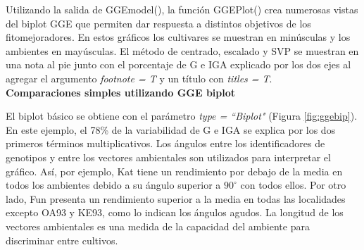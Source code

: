 Utilizando la salida de \textcolor{fandango}{GGEmodel()}, la función 
\textcolor{fandango}{GGEPlot()} crea numerosas vistas del biplot GGE que permiten dar respuesta a distintos objetivos de los fitomejoradores. En estos gráficos los cultivares se muestran en minúsculas y los ambientes en mayúsculas. El método de centrado, escalado y SVP se muestran en una nota al pie junto con el porcentaje de G e IGA explicado por los dos ejes al agregar el argumento \emph{footnote = T} y un título con \emph{titles = T}. \\

\textbf{Comparaciones simples utilizando GGE biplot}

El biplot básico se obtiene con el parámetro \emph{type = ``Biplot"} (Figura \ref{fig:ggebip}). En este ejemplo, el 78\% de la variabilidad de G e IGA se explica por los dos primeros términos multiplicativos. Los ángulos entre los identificadores de genotipos y entre los vectores ambientales son utilizados para interpretar el gráfico. Así, por ejemplo, Kat tiene un rendimiento por debajo de la media en todos los ambientes debido a su ángulo superior a $90^{\circ}$ con todos ellos. Por otro lado, Fun presenta un rendimiento superior a la media en todas las localidades excepto OA93 y KE93, como lo indican los ángulos agudos. La longitud de los vectores ambientales es una medida de la capacidad del ambiente para discriminar entre cultivos. 




